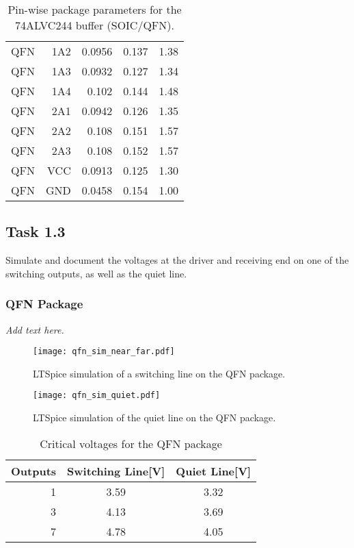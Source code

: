 \documentclass[../main.tex]{subfiles}
\begin{document}
\begin{table}[h]
\begin{tabular}{r|r r r r}
        QFN  & 1A2  & 0.0956 & 0.137 & 1.38 \\
        QFN  & 1A3  & 0.0932 & 0.127 & 1.34 \\
        QFN  & 1A4  & 0.102  & 0.144 & 1.48 \\
        QFN  & 2A1  & 0.0942 & 0.126 & 1.35 \\
        QFN  & 2A2  & 0.108  & 0.151 & 1.57 \\
        QFN  & 2A3  & 0.108  & 0.152 & 1.57 \\
        QFN  & VCC  & 0.0913 & 0.125 & 1.30 \\
        QFN  & GND  & 0.0458 & 0.154 & 1.00 \\
        \bottomrule[1pt]
    \end{tabular}
    \caption{Pin-wise package parameters for the 74ALVC244 buffer (SOIC/QFN).}
    \label{tab:pkg-params}
\end{table}

\newpage

\subsection{Task 1.3}

Simulate and document the voltages at the driver and receiving end on one of the switching outputs, as well as the quiet line.

\subsubsection{QFN Package}

\textit{Add text here.}
\lipsum[2]

\begin{figure}[h]
    \centering
    \texttt{[image: qfn\_sim\_near\_far.pdf]}
    \caption{LTSpice simulation of a switching line on the QFN package.}
    \label{fig:qfn_sim_near_far}
\end{figure}

\newpage

\begin{figure}[h]
    \centering
    \texttt{[image: qfn\_sim\_quiet.pdf]}
    \caption{LTSpice simulation of the quiet line on the QFN package.}
    \label{fig:qfn_sim_quiet}
\end{figure}

\begin{table}[h]
    \centering
    \begin{tabular}{r|c c}
        \toprule[1pt]
        \textbf{Outputs} & \textbf{Switching Line[V]} &\textbf{Quiet Line[V]} \\
        \midrule
        1  & 3.59  & 3.32 \\
        3  & 4.13  & 3.69 \\
        7  & 4.78  & 4.05  \\
        \bottomrule[1pt]
    \end{tabular}
    \caption{Critical voltages for the QFN package}
\end{table}
\end{document}
